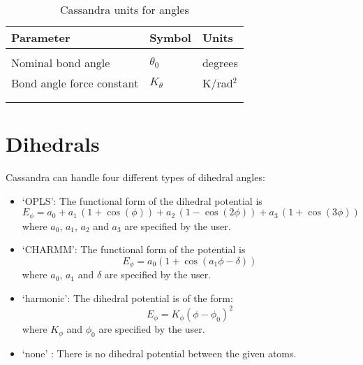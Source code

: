 \begin{center}
\begin{table}[h]
	\begin{center}
	\caption{Cassandra units for angles}
	\begin{tabular} {l l l} \\ \hline \hline
	Parameter  & Symbol  & Units \\ \hline \\
	Nominal bond angle & $\theta_0$ & degrees \\ 
	Bond angle force constant & $K_\theta$ & K/rad$^2$ \\ \\ \hline \\
	\end{tabular}
	\end{center}
	\label{Tab:Angle_Units}
\end{table}
\end{center}

\section{Dihedrals}\label{Sec:Dih}

Cassandra can handle four different types of dihedral angles:

\begin{itemize}

\item `OPLS': The functional form of the dihedral potential is
\begin{equation}
E_\phi = a_0 + a_1\, \left ( 1 + \cos(\phi)  \right ) + a_2 \, \left ( 1 -
  \cos(2\phi)\right ) + a_3 \, \left ( 1 + \cos (3\phi)\right )
\label{Eq:phi_OPLS}
\end{equation}
where $a_0$, $a_1$, $a_2$ and $a_3$ are specified by the user.

\item `CHARMM': The functional form of the potential is
\begin{equation}
E_\phi = a_0  (1 + \cos (a_1\phi - \delta))
\label{Eq:phi_CHARMM}
\end{equation}
where $a_0$, $a_1$ and $\delta$ are specified by the user.

\item `harmonic': The dihedral potential is of the form:
\begin{equation}
E_\phi = K_\phi (\phi - \phi_0)^2
\label{Eq:phi_harmonic}
\end{equation}
where $K_\phi$ and $\phi_0$ are specified by the user. 

\item `none' : There is no dihedral potential between the given atoms.  

\end{itemize}


